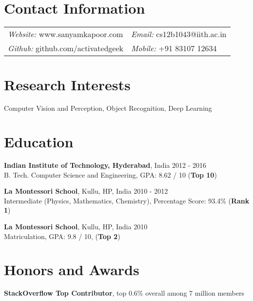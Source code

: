 \documentclass[margin,line]{res}
\begin{document}

\begin{resume}

\section{\sc Contact Information}

  \vspace{.05in}

  \begin{tabular}{@{}p{2.9in}p{6in}}
	{\it Website:} www.sanyamkapoor.com & {\it Email:} cs12b1043@iith.ac.in \\
	{\it Github:} github.com/activatedgeek & {\it Mobile:} +91 83107 12634  \\
  \end{tabular}

\section{\sc Research Interests}
  Computer Vision and Perception, Object Recognition, Deep Learning

\section{\sc Education}

  {\bf Indian Institute of Technology, Hyderabad}, India \hfill 2012 - 2016 \\
  	B. Tech. Computer Science and Engineering,
	GPA: 8.62 / 10 ({\bf Top 10})

  \vspace*{-2.5mm}

  {\bf La Montessori School}, Kullu, HP, India \hfill 2010 - 2012 \\
	Intermediate (Physics, Mathematics, Chemistry),
    Percentage Score: 93.4\% ({\bf Rank 1})

  \vspace*{-2.5mm}

  {\bf La Montessori School}, Kullu, HP, India \hfill 2010 \\
	Matriculation,
    GPA: 9.8 / 10, ({\bf Top 2})

\section{\sc Honors and Awards}

  {\bf StackOverflow Top Contributor}, top 0.6\% overall among 7 million members


\end{resume}
\end{document}
